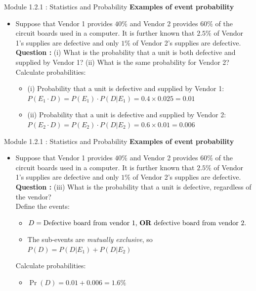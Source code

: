 \documentclass{beamer}
\begin{document}
\begin{frame}{Module 1.2.1 : Statistics and Probability}
\small
\textbf{Examples of event probability}
\begin{itemize}
\item
\scriptsize
Suppose that Vendor 1 provides $40\%$ and Vendor 2 provides $60\%$ of the
circuit boards used in a computer. It is further known that $2.5\%$ of
Vendor 1's supplies are defective and only $1\%$ of Vendor 2's supplies
are defective. \\ \vspace{0.25cm}
\textbf{Question :} (i) What is the probability that a unit is both defective and supplied by
Vendor 1? (ii) What is the same probability for Vendor 2? \\ \vspace{0.25cm}
Calculate probabilities:
\begin{itemize}
\scriptsize
\item (i) Probability that a unit is defective and supplied by Vendor 1: $P(E_1 \cdot D) = P(E_1) \cdot P(D|E_1) = 0.4 \times 0.025 = 0.01$
\item (ii) Probability that a unit is defective and supplied by Vendor 2: $P(E_2 \cdot D) = P(E_2) \cdot P(D|E_2) = 0.6 \times 0.01 = 0.006$
\end{itemize}
\end{itemize}
\end{frame}

\begin{frame}{Module 1.2.1 : Statistics and Probability}
\small
\textbf{Examples of event probability}
\begin{itemize}
\item
\scriptsize
Suppose that Vendor 1 provides $40\%$ and Vendor 2 provides $60\%$ of the
circuit boards used in a computer. It is further known that $2.5\%$ of
Vendor 1's supplies are defective and only $1\%$ of Vendor 2's supplies
are defective. \\ \vspace{0.25cm}
\textbf{Question :} (iii) What is the probability that a unit is defective, regardless of the vendor? \\ \vspace{0.25cm}
Define the events:
\begin{itemize}
\scriptsize
\item $D = \text{Defective board from vendor 1, \textbf{OR} defective board from vendor 2.}$
\item The sub-events are \textit{mutually exclusive}, so $P(D) = P(D|E_1)+P(D|E_2)$
\end{itemize}
Calculate probabilities:
\begin{itemize}
\scriptsize
\item $\Pr(D)=0.01 + 0.006 = 1.6\%$
\end{itemize}
\end{itemize}
\end{frame}
\end{document}
